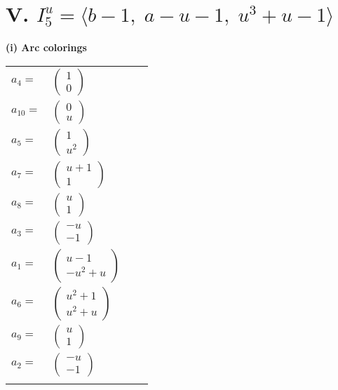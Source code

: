 \documentclass[1p]{elsarticle_modified}
\theoremstyle{definition}
\begin{document}
\centering \section*{V. $I^u_{5}= \langle b-1,\;a- u-1,\;u^3+u-1 \rangle$}
\flushleft \textbf{(i) Arc colorings}\\
\begin{tabular}{m{7pt} m{180pt} m{7pt} m{180pt} }
\flushright $a_{4}=$&$\begin{pmatrix}1\\0\end{pmatrix}$ \\
\flushright $a_{10}=$&$\begin{pmatrix}0\\u\end{pmatrix}$ \\
\flushright $a_{5}=$&$\begin{pmatrix}1\\u^2\end{pmatrix}$ \\
\flushright $a_{7}=$&$\begin{pmatrix}u+1\\1\end{pmatrix}$ \\
\flushright $a_{8}=$&$\begin{pmatrix}u\\1\end{pmatrix}$ \\
\flushright $a_{3}=$&$\begin{pmatrix}- u\\-1\end{pmatrix}$ \\
\flushright $a_{1}=$&$\begin{pmatrix}u-1\\- u^2+u\end{pmatrix}$ \\
\flushright $a_{6}=$&$\begin{pmatrix}u^2+1\\u^2+u\end{pmatrix}$ \\
\flushright $a_{9}=$&$\begin{pmatrix}u\\1\end{pmatrix}$ \\
\flushright $a_{2}=$&$\begin{pmatrix}- u\\-1\end{pmatrix}$\\&\end{tabular}
\end{document}
